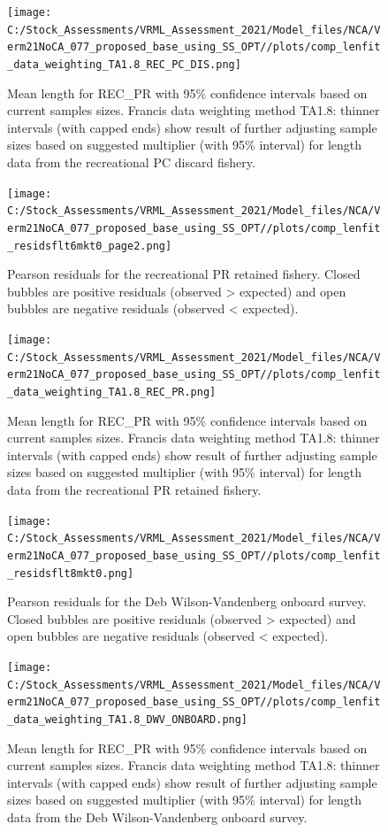 \documentclass[
  english,
  a4paper,
]{article}
\begin{document}
\begin{figure}
\centering
\texttt{[image: C:/Stock\_Assessments/VRML\_Assessment\_2021/Model\_files/NCA/Verm21NoCA\_077\_proposed\_base\_using\_SS\_OPT//plots/comp\_lenfit\_data\_weighting\_TA1.8\_REC\_PC\_DIS.png]}
\caption{Mean length for REC\_PR with 95\% confidence intervals based on current samples sizes. Francis data weighting method TA1.8: thinner intervals (with capped ends) show result of further adjusting sample sizes based on suggested multiplier (with 95\% interval) for length data from the recreational PC discard fishery.\label{fig:mean-len-fit-REC-PC-DIS}}
\end{figure}

\begin{figure}
\centering
\texttt{[image: C:/Stock\_Assessments/VRML\_Assessment\_2021/Model\_files/NCA/Verm21NoCA\_077\_proposed\_base\_using\_SS\_OPT//plots/comp\_lenfit\_residsflt6mkt0\_page2.png]}
\caption{Pearson residuals for the recreational PR retained fishery. Closed bubbles are positive residuals (observed \textgreater{} expected) and open bubbles are negative residuals (observed \textless{} expected).\label{fig:len-pearson-REC-PR}}
\end{figure}

\begin{figure}
\centering
\texttt{[image: C:/Stock\_Assessments/VRML\_Assessment\_2021/Model\_files/NCA/Verm21NoCA\_077\_proposed\_base\_using\_SS\_OPT//plots/comp\_lenfit\_data\_weighting\_TA1.8\_REC\_PR.png]}
\caption{Mean length for REC\_PR with 95\% confidence intervals based on current samples sizes. Francis data weighting method TA1.8: thinner intervals (with capped ends) show result of further adjusting sample sizes based on suggested multiplier (with 95\% interval) for length data from the recreational PR retained fishery.\label{fig:mean-len-fit-REC-PR}}
\end{figure}

\begin{figure}
\centering
\texttt{[image: C:/Stock\_Assessments/VRML\_Assessment\_2021/Model\_files/NCA/Verm21NoCA\_077\_proposed\_base\_using\_SS\_OPT//plots/comp\_lenfit\_residsflt8mkt0.png]}
\caption{Pearson residuals for the Deb Wilson-Vandenberg onboard survey. Closed bubbles are positive residuals (observed \textgreater{} expected) and open bubbles are negative residuals (observed \textless{} expected).\label{fig:len-pearson-DWV-ONBOARD}}
\end{figure}

\begin{figure}
\centering
\texttt{[image: C:/Stock\_Assessments/VRML\_Assessment\_2021/Model\_files/NCA/Verm21NoCA\_077\_proposed\_base\_using\_SS\_OPT//plots/comp\_lenfit\_data\_weighting\_TA1.8\_DWV\_ONBOARD.png]}
\caption{Mean length for REC\_PR with 95\% confidence intervals based on current samples sizes. Francis data weighting method TA1.8: thinner intervals (with capped ends) show result of further adjusting sample sizes based on suggested multiplier (with 95\% interval) for length data from the Deb Wilson-Vandenberg onboard survey.\label{fig:mean-len-fit-DWV-ONBOARD}}
\end{figure}
\end{document}
